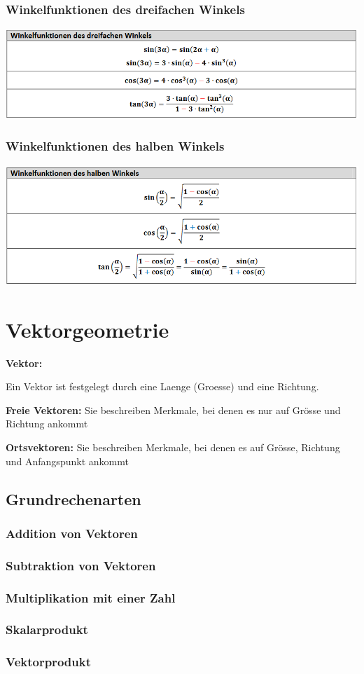 \subsubsection{Winkelfunktionen des dreifachen Winkels}
\includegraphics[scale=0.7]{gon4.PNG}

\subsubsection{Winkelfunktionen des halben Winkels}
\includegraphics[scale=0.7]{gon5.PNG}

\section{Vektorgeometrie}
\textbf{Vektor:}

Ein Vektor ist festgelegt durch eine Laenge (Groesse) und eine Richtung.

\textbf{Freie Vektoren: }
Sie beschreiben Merkmale,
bei denen es nur auf Grösse und Richtung ankommt

\textbf{Ortsvektoren:}
Sie beschreiben Merkmale,
bei denen es auf Grösse, Richtung und Anfangspunkt ankommt


\subsection{Grundrechenarten}
\subsubsection{Addition von Vektoren}

\subsubsection{Subtraktion von Vektoren}

\subsubsection{Multiplikation mit einer Zahl}

\subsubsection{Skalarprodukt}

\subsubsection{Vektorprodukt}



\newpage{}
